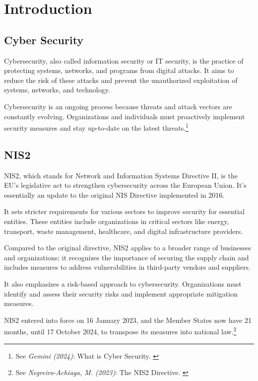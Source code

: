 %
%

\pagebreak
\section{Introduction}

\onehalfspacing

\subsection{Cyber Security}

Cybersecurity, also called information security or IT security, is the practice of protecting systems, networks, and programs from digital attacks. It aims to reduce the risk of these attacks and prevent the unauthorized exploitation of systems, networks, and technology.

Cybersecurity is an ongoing process because threats and attack vectors are constantly evolving. Organizations and individuals must proactively implement security measures and stay up-to-date on the latest threats.\footnote{See \textit{Gemini (2024)}: What is Cyber Security. \cite{bardCybersec}}

\subsection{NIS2}

NIS2, which stands for Network and Information Systems Directive II, is the EU's legislative act to strengthen cybersecurity across the European Union. It's essentially an update to the original NIS Directive implemented in 2016.

It sets stricter requirements for various sectors to improve security for essential entities. These entities include organizations in critical sectors like energy, transport, waste management, healthcare, and digital infrastructure providers.

Compared to the original directive, NIS2 applies to a broader range of businesses and organizations; it recognizes the importance of securing the supply chain and includes measures to address vulnerabilities in third-party vendors and suppliers.

It also emphasizes a risk-based approach to cybersecurity. Organizations must identify and assess their security risks and implement appropriate mitigation measures.

NIS2 entered into force on 16 January 2023, and the Member States now have 21 months, until 17 October 2024, to transpose its measures into national law.\footnote{See \textit{Negreiro-Achiaga, M. (2023)}: The NIS2 Directive. \cite{nisBrief}}


